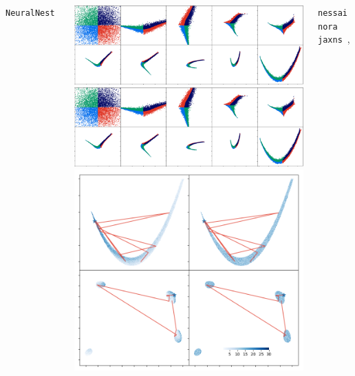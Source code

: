 \documentclass[aspectratio=169]{beamer}
\begin{document}
\begin{frame}
\begin{columns}[t]
        \vfill
        \texttt{NeuralNest}~
        \begin{columns}
            \includegraphics[width=\textwidth]{figures/rosenbrock_flow.png}
            \includegraphics[width=\textwidth]{figures/himmelblau_flow.png}
            \includegraphics[width=\textwidth]{figures/chains.png}
        \end{columns}
        \texttt{nessai}~ \texttt{nora}~ \texttt{jaxns}~,

\end{columns}
\end{frame}
\end{document}
